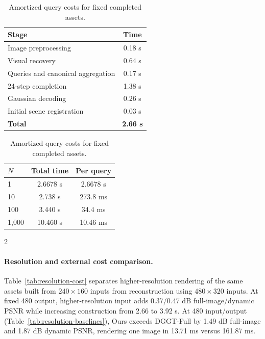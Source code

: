 \begin{table}[H]
\begin{minipage}[t]{0.48\textwidth}
\centering\small
\setlength{\tabcolsep}{4pt}
\caption{Scene-construction timing breakdown.}
\label{tab:timing-stages}
\begin{tabular}{@{}lc@{}}
\toprule
Stage & Time \\
\midrule
Image preprocessing & 0.18 s \\
Visual recovery & 0.64 s \\
Queries and canonical aggregation & 0.17 s \\
24-step completion & 1.38 s \\
Gaussian decoding & 0.26 s \\
Initial scene registration & 0.03 s \\
\textbf{Total} & \textbf{2.66 s} \\
\bottomrule
\end{tabular}
\end{minipage}\hfill
\begin{minipage}[t]{0.48\textwidth}
\centering\small
\setlength{\tabcolsep}{4pt}
\caption{Amortized query costs for fixed completed assets.}
\label{tab:reuse-time}
\begin{tabular}{@{}lcc@{}}
\toprule
$N$ & Total time & Per query \\
\midrule
1 & 2.6678 s & 2.6678 s \\
10 & 2.738 s & 273.8 ms \\
100 & 3.440 s & 34.4 ms \\
1,000 & 10.460 s & 10.46 ms \\
\bottomrule
\end{tabular}
\end{minipage}
\end{table}
\begin{multicols}{2}

\paragraph{Resolution and external cost comparison.}
Table~\ref{tab:resolution-cost} separates higher-resolution rendering of the same assets built from $240\times160$ inputs from reconstruction using $480\times320$ inputs. At fixed 480 output, higher-resolution input adds 0.37/0.47 dB full-image/dynamic PSNR while increasing construction from 2.66 to 3.92 s. At 480 input/output (Table~\ref{tab:resolution-baselines}), Ours exceeds DGGT-Full by 1.49 dB full-image and 1.87 dB dynamic PSNR, rendering one image in 13.71 ms versus 161.87 ms.

\end{multicols}
